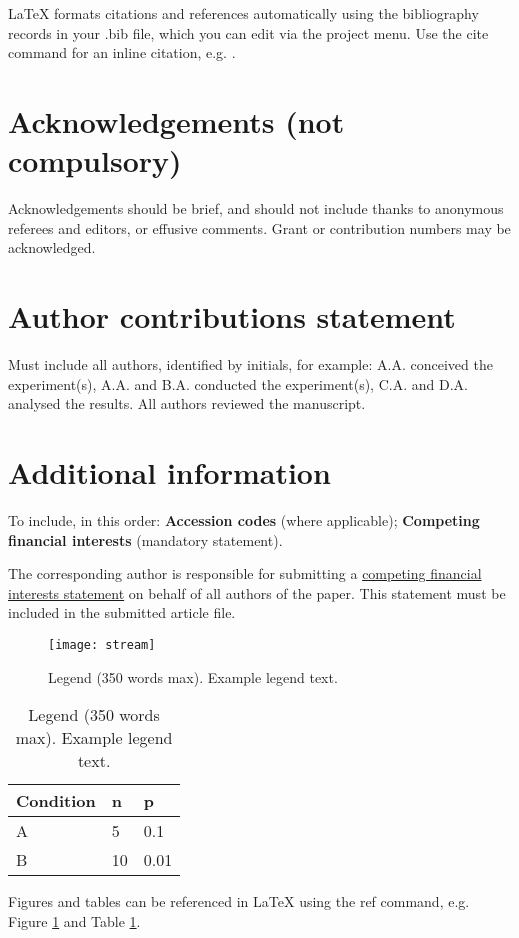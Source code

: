\documentclass[fleqn,10pt]{wlscirep}
\begin{document}


\noindent LaTeX formats citations and references automatically using
the bibliography records in your .bib file, which you can edit via the
project menu. Use the cite command for an inline citation, e.g.
\cite{Figueredo:2009dg}.

\section*{Acknowledgements (not compulsory)}

Acknowledgements should be brief, and should not include thanks to
anonymous referees and editors, or effusive comments. Grant or
contribution numbers may be acknowledged.

\section*{Author contributions statement}

Must include all authors, identified by initials, for example:
A.A. conceived the experiment(s), A.A. and B.A. conducted the
experiment(s), C.A. and D.A. analysed the results.  All authors
reviewed the manuscript.

\section*{Additional information}

To include, in this order: \textbf{Accession codes} (where
applicable); \textbf{Competing financial interests} (mandatory
statement).

The corresponding author is responsible for submitting a
\href{http://www.nature.com/srep/policies/index.html#competing}{competing
  financial interests statement} on behalf of all authors of the
paper. This statement must be included in the submitted article file.

\begin{figure}[ht]
\centering
\texttt{[image: stream]}
\caption{Legend (350 words max). Example legend text.}
\label{fig:stream}
\end{figure}

\begin{table}[ht]
\centering
\begin{tabular}{|l|l|l|}
\hline
Condition & n & p \\
\hline
A & 5 & 0.1 \\
\hline
B & 10 & 0.01 \\
\hline
\end{tabular}
\caption{\label{tab:example}Legend (350 words max). Example legend text.}
\end{table}

Figures and tables can be referenced in LaTeX using the ref command,
e.g. Figure \ref{fig:stream} and Table \ref{tab:example}.
\end{document}

